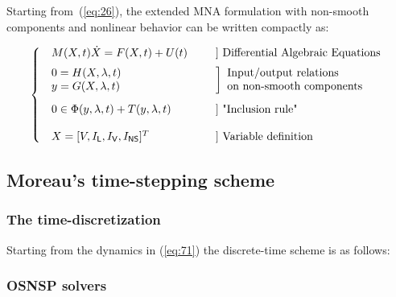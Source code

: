 \documentclass{article}
\begin{document}
Starting from~(\ref{eq:26}), the extended MNA formulation with non-smooth components and nonlinear behavior can  be written compactly as:

\begin{equation}
  \label{eq:71}
 \left\{ \begin{array}{l l l}
    \begin{array}{l}
  M(X,t) \dot X = F(X,t) + U(t)
\end{array}
& & ]\text{ Differential Algebraic Equations}\\[2mm]
  \begin{array}{l}
    0 = H(X,\lambda,t)\\
    y = G(X,\lambda,t) 
  \end{array} &  & \bigg]\begin{array}{l}
   \text{Input/output relations }\\
   \text{on non-smooth components}
  \end{array}  \\[5mm]
  \begin{array}{l}
  0 \in \Phi(y,\lambda,t) + T(y,\lambda,t)
\end{array}
&  & ] \text{ "Inclusion rule"}\\ \\
 \begin{array}{l}X =[V,I_{\mathsf L}, I_{\mathsf V}, I_{\mathsf{NS}}]^T
 \end{array}
 & &] \text{ Variable definition}\\
\end{array}\right.
\end{equation}







\subsection{Moreau's time-stepping scheme}
\label{section23}



\subsubsection{The time-discretization}

Starting from the dynamics in (\ref{eq:71}) the discrete-time scheme is as follows:


\subsubsection{OSNSP solvers}
\end{document}
